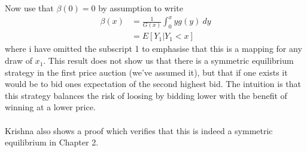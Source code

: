Now use that $\beta(0)=0$ by assumption to write
\begin{equation}
  \begin{split}
  \beta(x) &= \frac{1}{G(x)} \int_0^{x} y g(y) \ dy \\
  &=E[Y_1 | Y_1 < x]
\end{split}
\end{equation}
where i have omitted the subscript 1 to emphasise that this is a mapping for any draw of $x_1$. This result does not show us that there is a symmetric equilibrium strategy in the first price auction (we've assumed it), but that if one exists it would be to bid ones expectation of the second highest bid. The intuition is that this strategy balances the risk of loosing by bidding lower with the benefit of winning at a lower price.
\\ \\
Krishna also shows a proof which verifies that this is indeed a symmetric equilibrium in Chapter 2.
